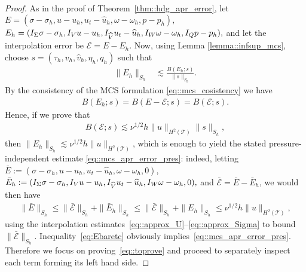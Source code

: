\begin{proof}
  As in the proof of Theorem~\ref{thm::hdg_apr_error},  let 
$    E = (\sigma-\sigma_h, u-u_h, u_t - \hat{u}_h, \omega-\omega_h, p - p_h), $
$    E_h = (I_\Sigma\sigma-\sigma_h, I_V u-u_h, I_{\widehat{V}} u_t - \widehat{u}_h, I_W\omega-\omega_h, I_Q p-p_h),$
  and let the interpolation error be $\mathcal E = E - E_h$. 
  Now, using  Lemma \ref{lemma::infsup_mcs}, choose $s = (\tau_h, v_h, \hat{v}_h, \eta_h, q_h)$ such that
  \begin{align*}
      \|E_h\|_{S_h}
      & \lesssim \frac{B( E_h;s)}{\|s\|_{S_h}}.
  \end{align*}
  By the consistency of the MCS formulation \eqref{eq::mcs_cosistency} we  have
  \begin{align*}
    B(E_h;s) = B(E - \mathcal{E};s) = B(\mathcal{E};s).
  \end{align*}
  Hence, if we prove that
  \begin{align} \label{eq::toprove}
    B(\mathcal{E}; s) \lesssim \nu^{1/2}h \|u\|_{H^2(\mathcal{T})} \|s\|_{S_h},
  \end{align}
  then $\| E_h \|_{S_h} \lesssim \nu^{1/2}h \|u\|_{H^2(\mathcal{T})}$, which is enough to yield
  the stated pressure-independent estimate \eqref{eq::mcs_apr_error_pres}: indeed,
  letting $
  \bar E := (\sigma-\sigma_h, u-u_h, u_t - \hat{u}_h, \omega-\omega_h, 0)$, 
  $\bar E_h := (I_\Sigma\sigma-\sigma_h, I_V u-u_h, I_{\widehat{V}} u_t - \widehat{u}_h, I_W\omega-\omega_h, 0),$ and
   $\bar{\mathcal E} = \bar E - \bar E_h$,  we would then  have
   \begin{align}
     \label{eq:Ebaretc}
\| \bar E \|_{S_h} \le \| \bar{\mathcal E} \|_{S_h} + \| \bar E_h \|_{S_h} \le \| \bar{\mathcal E} \|_{S_h} + \| E_h \|_{S_h} \le \nu^{1/2} h \|u\|_{H^2(\mathcal{T})},
\end{align}
using the interpolation
estimates~\eqref{eq::approx_U}--\eqref{eq::approx_Sigma} to bound
$\| \bar{\mathcal E} \|_{S_h}$. Inequality~\eqref{eq:Ebaretc} obviously  implies~\eqref{eq::mcs_apr_error_pres}. Therefore we focus on
proving~\eqref{eq::toprove} and  proceed to separately
inspect each term forming its left hand side.


\end{proof}
